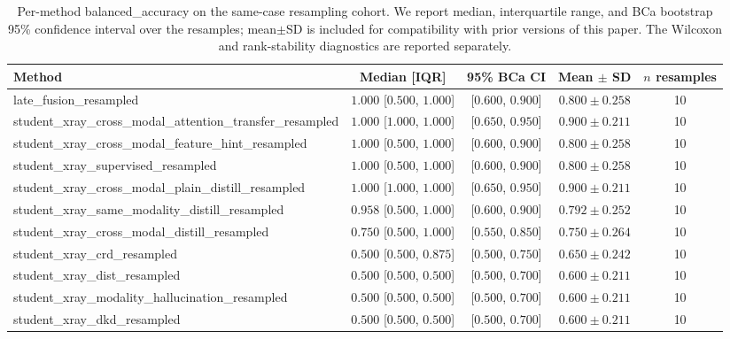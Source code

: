 \begin{table}[t]
\caption{Per-method balanced_accuracy on the same-case resampling cohort. We report median, interquartile range, and BCa bootstrap 95\% confidence interval over the resamples; mean$\pm$SD is included for compatibility with prior versions of this paper. The Wilcoxon and rank-stability diagnostics are reported separately.}
\label{tab:balanced_accuracy_resampling_stats}
\centering
\begin{tabular}{|l|c|c|c|c|}
\hline
Method & Median [IQR] & 95\% BCa CI & Mean $\pm$ SD & $n$ resamples \\ \hline
late_fusion_resampled & $1.000$ [$0.500$, $1.000$] & [$0.600$, $0.900$] & $0.800 \pm 0.258$ & 10 \\ \hline
student_xray_cross_modal_attention_transfer_resampled & $1.000$ [$1.000$, $1.000$] & [$0.650$, $0.950$] & $0.900 \pm 0.211$ & 10 \\ \hline
student_xray_cross_modal_feature_hint_resampled & $1.000$ [$0.500$, $1.000$] & [$0.600$, $0.900$] & $0.800 \pm 0.258$ & 10 \\ \hline
student_xray_supervised_resampled & $1.000$ [$0.500$, $1.000$] & [$0.600$, $0.900$] & $0.800 \pm 0.258$ & 10 \\ \hline
student_xray_cross_modal_plain_distill_resampled & $1.000$ [$1.000$, $1.000$] & [$0.650$, $0.950$] & $0.900 \pm 0.211$ & 10 \\ \hline
student_xray_same_modality_distill_resampled & $0.958$ [$0.500$, $1.000$] & [$0.600$, $0.900$] & $0.792 \pm 0.252$ & 10 \\ \hline
student_xray_cross_modal_distill_resampled & $0.750$ [$0.500$, $1.000$] & [$0.550$, $0.850$] & $0.750 \pm 0.264$ & 10 \\ \hline
student_xray_crd_resampled & $0.500$ [$0.500$, $0.875$] & [$0.500$, $0.750$] & $0.650 \pm 0.242$ & 10 \\ \hline
student_xray_dist_resampled & $0.500$ [$0.500$, $0.500$] & [$0.500$, $0.700$] & $0.600 \pm 0.211$ & 10 \\ \hline
student_xray_modality_hallucination_resampled & $0.500$ [$0.500$, $0.500$] & [$0.500$, $0.700$] & $0.600 \pm 0.211$ & 10 \\ \hline
student_xray_dkd_resampled & $0.500$ [$0.500$, $0.500$] & [$0.500$, $0.700$] & $0.600 \pm 0.211$ & 10 \\ \hline
\end{tabular}
\end{table}